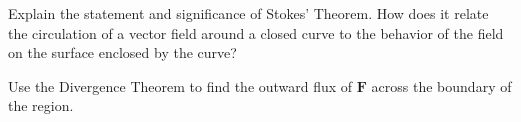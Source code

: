 \begin{mdframed}[ backgroundcolor=lightblue, linewidth=1pt, hidealllines=true]
\begin{ExerciseList}
	
	\Exercise[label={ex1712}] 
	Explain the statement and significance of Stokes' Theorem. How does it relate the circulation of a vector field around a closed curve to the behavior of the field on the surface enclosed by the curve?
	 
	  Use the Divergence Theorem to find the outward flux of \( \mathbf{F} \) across the boundary of the region.
	  
	  
	  
	  
	 
	  
	  
	  
	  

	  \end{ExerciseList}
\end{mdframed}